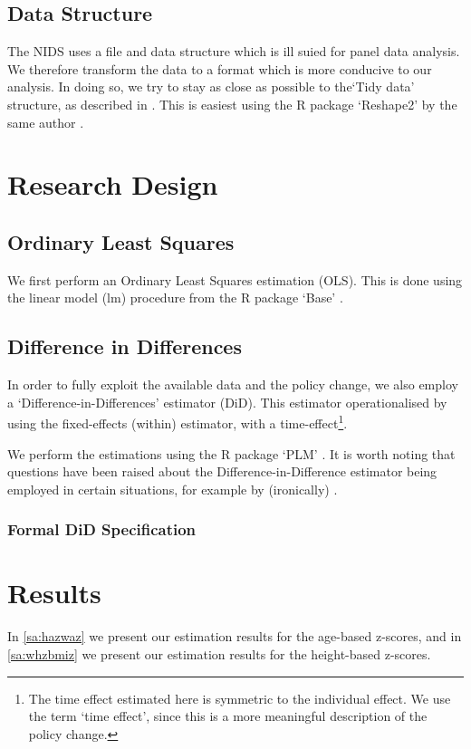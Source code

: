 \begin{refsection}
\subsection{Data Structure}
The NIDS uses a file and data structure which is ill suied for panel data analysis.
We therefore transform the data to a format which is more conducive to our analysis.
In doing so, we try to stay as close as possible to the`Tidy data' structure, as described in \textcite{wickham2014tidy}.
This is easiest using the R package `Reshape2' by the same author \parencite[Reshape2 implementation]{wickham2007reshaping}.

\section{Research Design}
\label{sa:identification}



\subsection{Ordinary Least Squares}
We first perform an Ordinary Least Squares estimation (OLS).
This is done using the linear model (lm) procedure from the R package `Base' \parencite{R}.

\subsection{Difference in Differences}
In order to fully exploit the available data and the policy change,
we also employ a `Difference-in-Differences' estimator (DiD).
This estimator operationalised by using the fixed-effects (within) estimator, with a time-effect\footnote{The time effect estimated here is symmetric to the individual effect.
We use the term `time effect', since this is a more meaningful description of the policy change.}.

We perform the estimations using the R package `PLM' \parencite[see][]{croissant2008panel}.
It is worth noting  that questions have been raised about the Difference-in-Difference estimator being employed in certain situations,
for example by (ironically) \textcite{bertrand2004much}.

\subsubsection{Formal DiD Specification}

\section{Results}
In \autoref{sa:hazwaz} we present our estimation results for the age-based z-scores,
and in \autoref{sa:whzbmiz} we present our estimation results for the height-based z-scores.


\end{refsection}
